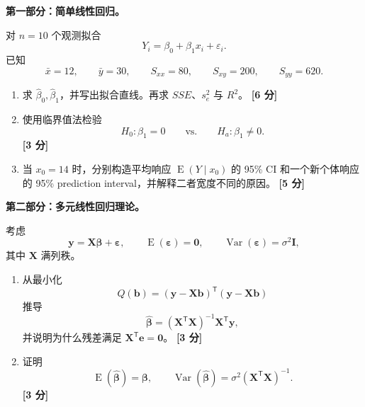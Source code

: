 \documentclass[11pt,a4paper]{article}
\newcommand{\E}{\operatorname{E}}
\newcommand{\Var}{\operatorname{Var}}
\newcommand{\by}{\mathbf{y}}
\newcommand{\bX}{\mathbf{X}}
\newcommand{\bI}{\mathbf{I}}
\newcommand{\be}{\mathbf{e}}
\newcommand{\bbeta}{\boldsymbol{\beta}}
\newcommand{\bvarepsilon}{\boldsymbol{\varepsilon}}
\newcommand{\pts}[1]{\hfill\textbf{[#1 分]}}
\begin{document}
\begin{questionbox}[第 4 题：简单回归计算与多元回归证明（20 分）]
\textbf{第一部分：简单线性回归。}

对 $n=10$ 个观测拟合
\[
  Y_i=\beta_0+\beta_1x_i+\varepsilon_i.
\]
已知
\[
  \bar x=12,\qquad
  \bar y=30,\qquad
  S_{xx}=80,\qquad
  S_{xy}=200,\qquad
  S_{yy}=620.
\]

\begin{enumerate}
  \item 求 $\hat\beta_0,\hat\beta_1$，并写出拟合直线。再求
  $SSE$、$s_e^2$ 与 $R^2$。 \pts{6}

  \item 使用临界值法检验
  \[
    H_0:\beta_1=0
    \qquad\text{vs.}\qquad
    H_a:\beta_1\ne0.
  \]
  \pts{3}

  \item 当 $x_0=14$ 时，分别构造平均响应
  $\E(Y\mid x_0)$ 的 95\% CI 和一个新个体响应的 95\% prediction interval，并解释二者宽度不同的原因。 \pts{5}
\end{enumerate}

\textbf{第二部分：多元线性回归理论。}

考虑
\[
  \by=\bX\bbeta+\bvarepsilon,
  \qquad
  \E(\bvarepsilon)=\mathbf0,
  \qquad
  \Var(\bvarepsilon)=\sigma^2\bI,
\]
其中 $\bX$ 满列秩。

\begin{enumerate}[resume]
  \item 从最小化
  \[
    Q(\mathbf b)=(\by-\bX\mathbf b)^\mathsf{T}(\by-\bX\mathbf b)
  \]
  推导
  \[
    \hat{\bbeta}=(\bX^\mathsf{T}\bX)^{-1}\bX^\mathsf{T}\by,
  \]
  并说明为什么残差满足 $\bX^\mathsf{T}\be=\mathbf0$。 \pts{3}

  \item 证明
  \[
    \E(\hat{\bbeta})=\bbeta,
    \qquad
    \Var(\hat{\bbeta})
    =
    \sigma^2(\bX^\mathsf{T}\bX)^{-1}.
  \]
  \pts{3}
\end{enumerate}
\end{questionbox}
\end{document}
